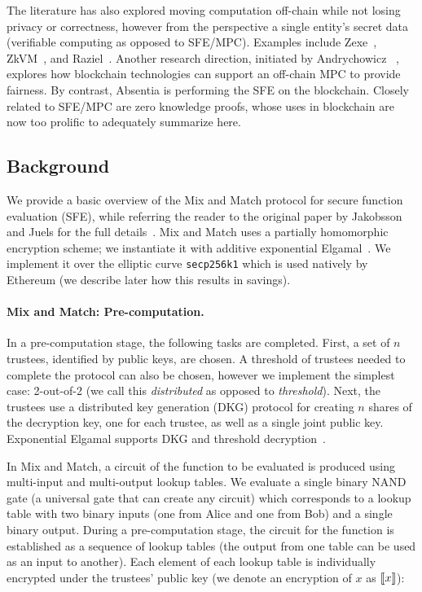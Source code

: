 
The literature has also explored moving computation off-chain while not losing privacy or correctness, however from the perspective a single entity's secret data (\ie verifiable computing as opposed to SFE/MPC). Examples include Zexe~\cite{bowe2020zexe}, ZkVM~\cite{zkvm}, and Raziel~\cite{sanchez2018raziel}. Another research direction, initiated by Andrychowicz \etal~\cite{andrychowicz2014secure}, explores how blockchain technologies can support an off-chain MPC to provide fairness. By contrast, Absentia is performing the SFE on the blockchain. Closely related to SFE/MPC are zero knowledge proofs, whose uses in blockchain are now too prolific to adequately summarize here.




\subsection{Background}

We provide a basic overview of the Mix and Match protocol for secure function evaluation (SFE), while referring the reader to the original paper by Jakobsson and Juels for the full details~\cite{JJ00}. Mix and Match uses a partially homomorphic encryption scheme; we instantiate it with additive exponential Elgamal~\cite{CGS97}. We implement it over the elliptic curve \texttt{secp256k1} which is used natively by Ethereum (we describe later how this results in savings).

\paragraph{Mix and Match: Pre-computation.} 

In a pre-computation stage, the following tasks are completed. First, a set of $n$ trustees, identified by public keys, are chosen. A threshold of trustees needed to complete the protocol can also be chosen, however we implement the simplest case: 2-out-of-2 (we call this \emph{distributed} as opposed to \emph{threshold}). Next, the trustees use a distributed key generation (DKG) protocol for creating $n$ shares of the decryption key, one for each trustee, as well as a single joint public key. Exponential Elgamal supports DKG and threshold decryption~\cite{Ped91a}.

In Mix and Match, a circuit of the function to be evaluated is produced using multi-input and multi-output lookup tables. We evaluate a single binary NAND gate (a universal gate that can create any circuit) which corresponds to a lookup table with two binary inputs (one from Alice and one from Bob) and a single binary output. During a pre-computation stage, the circuit for the function is established as a sequence of lookup tables (the output from one table can be used as an input to another). Each element of each lookup table is individually encrypted under the trustees' public key (we denote an encryption of $x$ as $\llbracket x \rrbracket$):

